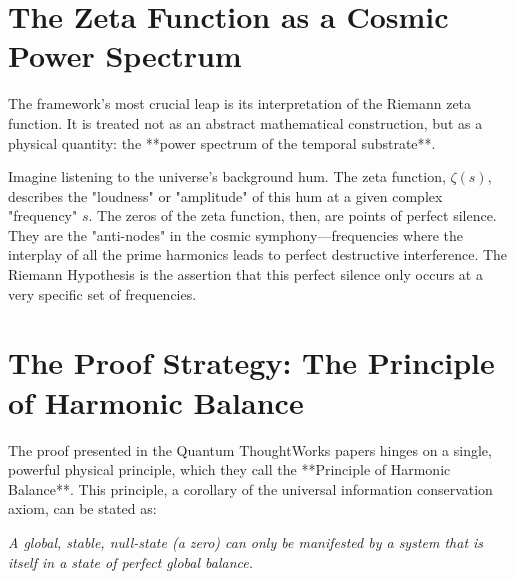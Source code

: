 \documentclass[12pt]{report}
\begin{document}
\section{The Zeta Function as a Cosmic Power Spectrum}
The framework's most crucial leap is its interpretation of the Riemann zeta function. It is treated not as an abstract mathematical construction, but as a physical quantity: the **power spectrum of the temporal substrate**.

Imagine listening to the universe's background hum. The zeta function, $\zeta(s)$, describes the "loudness" or "amplitude" of this hum at a given complex "frequency" $s$. The zeros of the zeta function, then, are points of perfect silence. They are the "anti-nodes" in the cosmic symphony—frequencies where the interplay of all the prime harmonics leads to perfect destructive interference. The Riemann Hypothesis is the assertion that this perfect silence only occurs at a very specific set of frequencies.

\section{The Proof Strategy: The Principle of Harmonic Balance}
The proof presented in the Quantum ThoughtWorks papers hinges on a single, powerful physical principle, which they call the **Principle of Harmonic Balance**. This principle, a corollary of the universal information conservation axiom, can be stated as:

\textit{A global, stable, null-state (a zero) can only be manifested by a system that is itself in a state of perfect global balance.}
\end{document}
